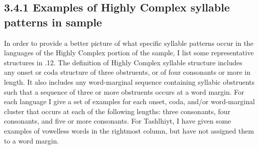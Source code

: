 \subsection{3.4.1 Examples of Highly Complex syllable patterns in sample}

  In order to provide a better picture of what specific syllable patterns occur in the languages of the Highly Complex portion of the sample, I list some representative structures in .12. The definition of Highly Complex syllable structure includes any onset or coda structure of three obstruents, or of four consonants or more in length. It also includes any word-marginal sequence containing syllabic obstruents such that a sequence of three or more obstruents occurs at a word margin. For each language I give a set of examples for each onset, coda, and/or word-marginal cluster that occurs at each of the following lengths: three consonants, four consonants, and five or more consonants. For Tashlhiyt, I have given some examples of vowelless words in the rightmost column, but have not assigned them to a word margin.






